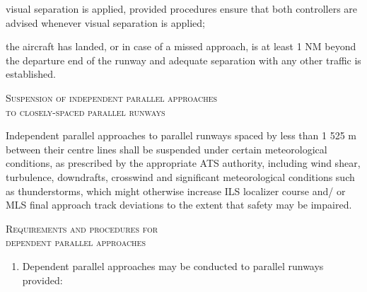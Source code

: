 \begin{enumeratesc}
\begin{enumerate}
        \begin{enumalph}
            \item visual separation is applied, provided procedures ensure that both controllers are advised whenever visual separation is applied;
            \item the aircraft has landed, or in case of a missed approach, is at least 1 NM beyond the departure end of the runway and adequate separation with any other traffic is established.
        \end{enumalph}

    \end{enumerate}

    \item \textsc{Suspension of independent parallel approaches \\ to closely-spaced parallel runways}
    \begin{enumempty}
        \item Independent parallel approaches to parallel runways spaced by less than 1 525 m between their centre lines shall be suspended under certain meteorological conditions, as prescribed by the appropriate ATS authority, including wind shear, turbulence, downdrafts, crosswind and significant meteorological conditions such as thunderstorms, which might otherwise increase ILS localizer course and/ or MLS final approach track deviations to the extent that safety may be impaired.
    \end{enumempty}

    \item \textsc{Requirements and procedures for \\ dependent parallel approaches}
    \begin{enumerate}
        \item Dependent parallel approaches may be conducted to parallel runways provided:


\end{enumerate}
\end{enumeratesc}
